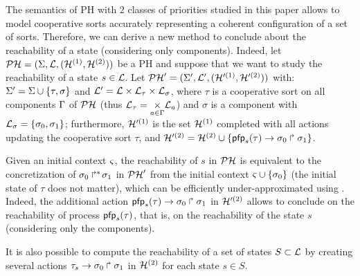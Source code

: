 \newcommand{\total}{\tau}
\newcommand{\reach}{\sigma}

The semantics of PH with $2$ classes of priorities studied in this paper allows to model cooperative sorts accurately representing a coherent configuration of a set of sorts.
Therefore, we can derive a new method to conclude about the reachability of a state (considering only components).
Indeed, let $\mathcal{PH} = (\Sigma, \mathcal{L}, (\mathcal{H}^{(1)}, \mathcal{H}^{(2)}))$ be a PH and suppose that we want to study the reachability of a state $s \in \mathcal{L}$.
Let $\mathcal{PH}' = (\Sigma', \mathcal{L}', (\mathcal{H}'^{(1)}, \mathcal{H}'^{(2)}))$
with: $\PHs' = \PHs \cup \{ \total, \reach \}$ and $\PHl' = \PHl \times \PHl_\total \times \PHl_\reach$,
where $\total$ is a cooperative sort on all components $\Gamma$ of $\mathcal{PH}$ (thus $\PHl_\total = \underset{a \in \components}{\times} \PHl_a$)
and $\reach$ is a component with $\PHl_\reach = \{ \reach_0, \reach_1 \}$;
furthermore, $\mathcal{H}'^{(1)}$ is the set $\mathcal{H}^{(1)}$ completed with all actions updating the cooperative sort $\total$,
and $\PHh'^{(2)} = \PHh^{(2)} \cup \{ \PHhit{\pfp_s(\total)}{\reach_0}{\reach_1} \}$.

Given an initial context $\varsigma$, the reachability of $s$ in $\mathcal{PH}$ is equivalent to the concretization of $\PHobjp{\reach}{0}{1}$ in $\mathcal{PH}'$ from the initial context $\ctx \cup \{ \reach_0 \}$ (the initial state of $\total$ does not matter), which can be efficiently under-approximated using .
Indeed, the additional action $\PHhit{\pfp_s(\total)}{\reach_0}{\reach_1}$ in $\mathcal{H}'^{(2)}$ allows to conclude on the reachability of process $\pfp_s(\total)$, that is, on the reachability of the state $s$ (considering only the components).

It is also possible to compute the reachability of a set of states $S \subset \mathcal{L}$ by creating several actions $\PHhit{\total_s}{\reach_0}{\reach_1}$ in $\mathcal{H}^{(2)}$ for each state $s \in S$.
